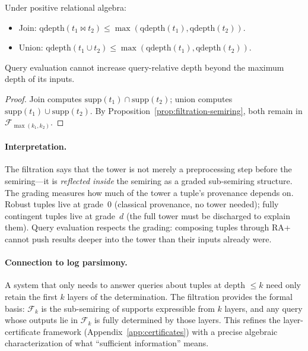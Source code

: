 \begin{corollary}
  \label{cor:propagation-filtration}
  Under positive relational algebra:
  \begin{itemize}[nosep]
    \item Join: $\mathrm{qdepth}(t_1 \bowtie t_2) \le
          \max(\mathrm{qdepth}(t_1), \mathrm{qdepth}(t_2))$.
    \item Union: $\mathrm{qdepth}(t_1 \cup t_2) \le
          \max(\mathrm{qdepth}(t_1), \mathrm{qdepth}(t_2))$.
  \end{itemize}
  Query evaluation cannot increase query-relative depth beyond the maximum
  depth of its inputs.
\end{corollary}
\begin{proof}
  Join computes $\mathrm{supp}(t_1) \cap \mathrm{supp}(t_2)$;
  union computes $\mathrm{supp}(t_1) \cup \mathrm{supp}(t_2)$.
  By Proposition~\ref{prop:filtration-semiring}, both remain in
  $\mathcal{F}_{\max(k_1, k_2)}$.
\end{proof}

\paragraph{Interpretation.}
The filtration says that the tower is not merely a preprocessing step
before the semiring---it is \emph{reflected inside} the semiring as a
graded sub-semiring structure.
The grading measures how much of the tower a tuple's provenance depends on.
Robust tuples live at grade~$0$ (classical provenance, no tower needed);
fully contingent tuples live at grade~$d$ (the full tower must be
discharged to explain them).
Query evaluation respects the grading: composing tuples through RA+ cannot
push results deeper into the tower than their inputs already were.

\paragraph{Connection to log parsimony.}
A system that only needs to answer queries about tuples at depth $\le k$
need only retain the first $k$ layers of the determination.
The filtration provides the formal basis: $\mathcal{F}_k$ is the
sub-semiring of supports expressible from $k$ layers, and any query whose
outputs lie in $\mathcal{F}_k$ is fully determined by those layers.
This refines the layer-certificate framework
(Appendix~\ref{app:certificates}) with a precise algebraic characterization
of what ``sufficient information'' means.
